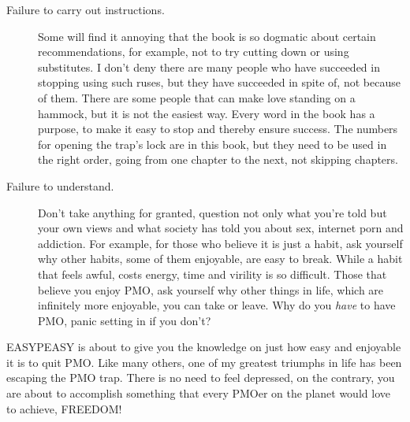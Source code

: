 \documentclass[easypeasy.tex]{subfiles}
\begin{document}
\begin{description}
  \item [Failure to carry out instructions.] Some will find it annoying that the book is so dogmatic about certain recommendations, for example, not to try cutting down or using substitutes. I don't deny there are many people who have succeeded in stopping using such ruses, but they have succeeded in spite of, not because of them. There are some people that can make love standing on a hammock, but it is not the easiest way. Every word in the book has a purpose, to make it easy to stop and thereby ensure success. The numbers for opening the trap's lock are in this book, but they need to be used in the right order, going from one chapter to the next, not skipping chapters.

  \item [Failure to understand.] Don't take anything for granted, question not only what you're told but your own views and what society has told you about sex, internet porn and addiction. For example, for those who believe it is just a habit, ask yourself why other habits, some of them enjoyable, are easy to break. While a habit that feels awful, costs energy, time and virility is so difficult. Those that believe you enjoy PMO, ask yourself why other things in life, which are infinitely more enjoyable, you can take or leave. Why do you \textit{have} to have PMO, panic setting in if you don't?
\end{description}

EASYPEASY is about to give you the knowledge on just how easy and enjoyable it is to quit PMO. Like many others, one of my greatest triumphs in life has been escaping the PMO trap. There is no need to feel depressed, on the contrary, you are about to accomplish something that every PMOer on the planet would love to achieve, FREEDOM!
\end{document}
